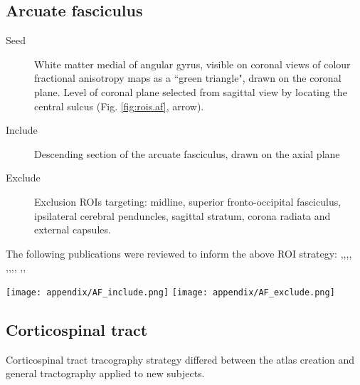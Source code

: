 \subsection{Arcuate fasciculus}

\begin{description}
  \item[Seed] White matter medial of angular gyrus, visible on coronal views of colour fractional anisotropy maps as a ``green triangle", drawn on the coronal plane.
  Level of coronal plane selected from sagittal view by locating the central sulcus (Fig. \ref{fig:rois.af}, arrow).
  \item[Include] Descending section of the arcuate fasciculus, drawn on the axial plane
  \item[Exclude] Exclusion ROIs targeting: midline, superior fronto-occipital fasciculus, ipsilateral cerebral penduncles, sagittal stratum, corona radiata and external capsules.
\end{description}

The following publications were reviewed to inform the above ROI strategy: \textcite{Brown2014a},\textcite{Catani2002},\textcite{Catani2005},\textcite{Chen2015c},
\textcite{Eluvathingal2007},\textcite{Kamali2014},\textcite{Martino2013a},\textcite{Nucifora2005},
\textcite{Parker2005},\textcite{Bain2019},\textcite{Talozzi2018}

\begin{figure*}[h]
  \centering
    \texttt{[image: appendix/AF\_include.png]}
    \texttt{[image: appendix/AF\_exclude.png]}
  \caption{Seed (yellow), inclusion (green) and exclusion (red) regions of interest for the arcuate fasciculus. Arrow indicates central sulcus, landmark for seed ROI.}
  \label{fig:rois.af}
\end{figure*}

\subsection{Corticospinal tract}

Corticospinal tract tracography strategy differed between the atlas creation and general tractography applied to new subjects.

